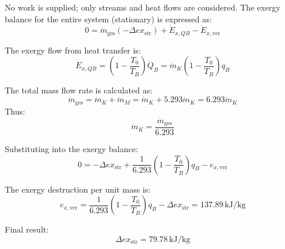 No work is supplied; only streams and heat flows are considered. The exergy balance for the entire system (stationary) is expressed as:  
\[
0 = \dot{m}_{\text{ges}} (-\Delta ex_{\text{str}}) + \dot{E}_{x,QB} - \dot{E}_{x,\text{ver}}
\]  

The exergy flow from heat transfer is:  
\[
\dot{E}_{x,QB} = \left( 1 - \frac{T_0}{T_B} \right) \dot{Q}_B = \dot{m}_K \left( 1 - \frac{T_0}{T_B} \right) q_B
\]  

The total mass flow rate is calculated as:  
\[
\dot{m}_{\text{ges}} = \dot{m}_K + \dot{m}_M = \dot{m}_K + 5.293 \dot{m}_K = 6.293 \dot{m}_K
\]  
Thus:  
\[
\dot{m}_K = \frac{\dot{m}_{\text{ges}}}{6.293}
\]  

Substituting into the exergy balance:  
\[
0 = -\Delta ex_{\text{str}} + \frac{1}{6.293} \left( 1 - \frac{T_0}{T_B} \right) q_B - e_{x,\text{ver}}
\]  

The exergy destruction per unit mass is:  
\[
e_{x,\text{ver}} = \frac{1}{6.293} \left( 1 - \frac{T_0}{T_B} \right) q_B - \Delta ex_{\text{str}} = 137.89 \, \text{kJ/kg}
\]  

Final result:  
\[
\Delta ex_{\text{str}} = 79.78 \, \text{kJ/kg}
\]